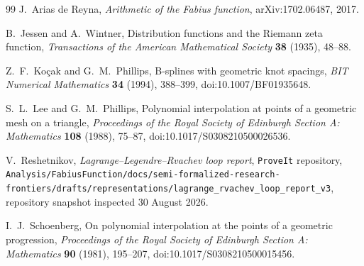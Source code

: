 \begin{thebibliography}{99}
J.~Arias de Reyna,
\newblock \emph{Arithmetic of the Fabius function},
\newblock arXiv:1702.06487, 2017.

B.~Jessen and A.~Wintner,
\newblock Distribution functions and the Riemann zeta function,
\newblock \emph{Transactions of the American Mathematical Society}
\textbf{38} (1935), 48--88.

Z.~F.~Ko\c{c}ak and G.~M.~Phillips,
\newblock B-splines with geometric knot spacings,
\newblock \emph{BIT Numerical Mathematics} \textbf{34} (1994), 388--399,
\newblock doi:10.1007/BF01935648.

S.~L.~Lee and G.~M.~Phillips,
\newblock Polynomial interpolation at points of a geometric mesh on a triangle,
\newblock \emph{Proceedings of the Royal Society of Edinburgh Section A:
Mathematics} \textbf{108} (1988), 75--87,
\newblock doi:10.1017/S0308210500026536.

V.~Reshetnikov,
\newblock \emph{Lagrange--Legendre--Rvachev loop report},
\newblock \texttt{ProveIt} repository,
\nolinkurl{Analysis/FabiusFunction/docs/semi-formalized-research-frontiers/drafts/representations/lagrange_rvachev_loop_report_v3},
repository snapshot inspected 30 August 2026.

I.~J.~Schoenberg,
\newblock On polynomial interpolation at the points of a geometric
progression,
\newblock \emph{Proceedings of the Royal Society of Edinburgh Section A:
Mathematics} \textbf{90} (1981), 195--207,
\newblock doi:10.1017/S0308210500015456.

\end{thebibliography}
